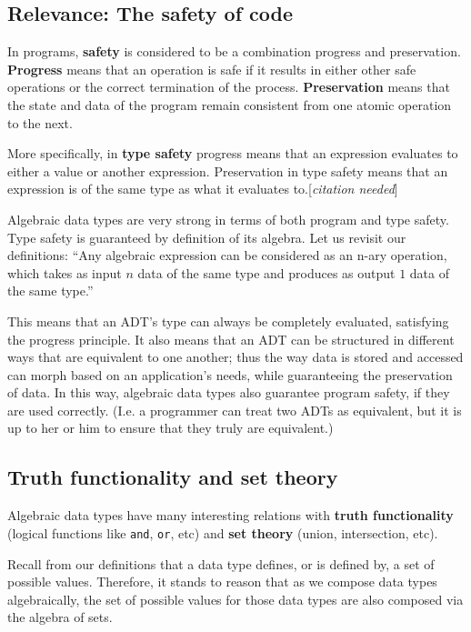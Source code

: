 \documentclass[12pt,a4paper]{article}
\newcommand{\citationNeeded}{[\textit{citation needed}]}
\begin{document}
		\pagebreak
		\subsection{Relevance: The safety of code}
		
		In programs, \textbf{safety} is considered to be a combination progress and preservation. \textbf{Progress} means that an operation is safe if it results in either other safe operations or the correct termination of the process. \textbf{Preservation} means that the state and data of the program remain consistent from one atomic operation to the next.
		
		More specifically, in \textbf{type safety} progress means that an expression evaluates to either a value or another expression. Preservation in type safety means that an expression is of the same type as what it evaluates to.\citationNeeded
		
		Algebraic data types are very strong in terms of both program and type safety. Type safety is guaranteed by definition of its algebra. Let us revisit our definitions: \textquotedblleft Any algebraic expression can be considered as an n-ary operation, which takes as input $n$ data of the same type and produces as output $1$ data of the same type.\textquotedblright 
		
		This means that an ADT's type can always be completely evaluated, satisfying the progress principle. It also means that an ADT can be structured in different ways that are equivalent to one another; thus the way data is stored and accessed can morph based on an application's needs, while guaranteeing the preservation of data. In this way, algebraic data types also guarantee program safety, if they are used correctly. (I.e. a programmer can treat two ADTs as equivalent, but it is up to her or him to ensure that they truly are equivalent.)
		
		
		\subsection{Truth functionality and set theory}
		
		Algebraic data types have many interesting relations with \textbf{truth functionality} (logical functions like \texttt{and}, \texttt{or}, etc) and \textbf{set theory} (union, intersection, etc).
		
		Recall from our definitions that a data type defines, or is defined by, a set of possible values. Therefore, it stands to reason that as we compose data types algebraically, the set of possible values for those data types are also composed via the algebra of sets.
		
\end{document}
